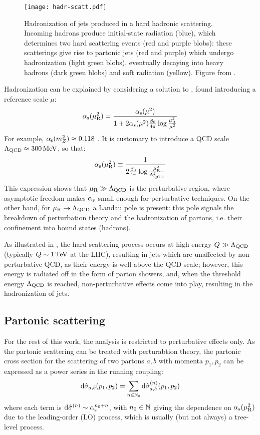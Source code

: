 \begin{figure}
  \centering
  \texttt{[image: hadr-scatt.pdf]}
  \caption{Hadronization of jets produced in a hard hadronic scattering. Incoming hadrons produce initial-state radiation (blue), which determines two hard scattering events (red and purple blobs): these scatterings give rise to partonic jets (red and purple) which undergo hadronization (light green blobs), eventually decaying into heavy hadrons (dark green blobs) and soft radiation (yellow). Figure from \cite{Hoche-2014}.}
  \label{fig:hadr-scatt}
\end{figure}

Hadronization can be explained by considering a solution to , found introducing a reference scale $ \mu $:
\begin{equation}
  \alpha_\text{s}(\mu_\text{R}^2) = \frac{\alpha_\text{s}(\mu^2)}{1 + 2 \alpha_\text{s}(\mu^2) \frac{\beta_0}{4\pi} \log \frac{\mu_\text{R}^2}{\mu^2}}
\end{equation}
For example, $ \alpha_\text{s}(m_Z^2) \approx 0.118 $ \cite{PDG-2024}. It is customary to introduce a QCD scale $ \Lambda_\text{QCD} \approx 300 \,\mathrm{MeV} $, so that:
\begin{equation}
  \alpha_\text{s}(\mu_\text{R}^2) \equiv \frac{1}{2\frac{\beta_0}{4\pi} \log \frac{\mu_\text{R}^2}{\Lambda_\text{QCD}^2}}
\end{equation}
This expression shows that $ \mu_\text{R} \gg \Lambda_\text{QCD} $ is the perturbative region, where asymptotic freedom makes $ \alpha_\text{s} $ small enough for perturbative techniques. On the other hand, for $ \mu_\text{R} \rightarrow \Lambda_\text{QCD} $ a Landau pole is present: this pole signals the breakdown of perturbation theory and the hadronization of partons, i.e. their confinement into bound states (hadrons).

As illustrated in , the hard scattering process occurs at high energy $ Q \gg \Lambda_\text{QCD} $ (typically $ Q \sim 1\,\mathrm{TeV} $ at the LHC), resulting in jets which are unaffected by non-perturbative QCD, as their energy is well above the QCD scale; however, this energy is radiated off in the form of parton showers, and, when the threshold energy $ \Lambda_\text{QCD} $ is reached, non-perturbative effects come into play, resulting in the hadronization of jets.

\subsection{Partonic scattering}

For the rest of this work, the analysis is restricted to perturbative effects only. As the partonic scattering can be treated with perturabtion theory, the partonic cross section for the scattering of two partons $ a , b $ with momenta $ p_1 , p_2 $ can be expressed as a power series in the running coupling:
\begin{equation}
  \mathrm{d}\hat{\sigma}_{a,b}(p_1 , p_2) = \sum_{n \in \mathbb{N}_0} \mathrm{d}\hat{\sigma}_{a,b}^{(n)}(p_1 , p_2)
  \label{eq:part-ser-exp}
\end{equation}
where each term is $ \mathrm{d}\hat{\sigma}^{(n)} \sim \alpha_\text{s}^{n_0 + n} $, with $ n_0 \in \mathbb{N} $ giving the dependence on $ \alpha_\text{s}(\mu_\text{R}^2) $ due to the leading-order (LO) process, which is usually (but not always) a tree-level process.


